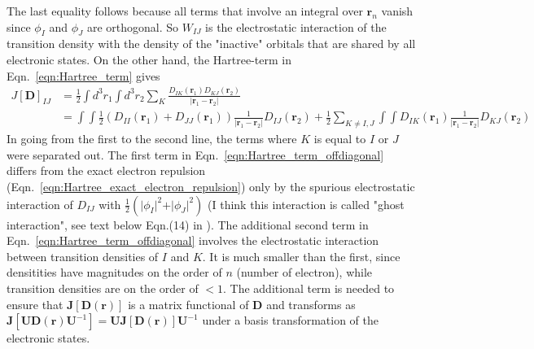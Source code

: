 \documentclass[journal=jpclcd,manuscript=letter]{achemso}
\newcommand\m[1]{\mathbf{#1}}
\renewcommand\vec[1]{\mathbf{#1}}
\begin{document}
The last equality follows because all terms that involve an integral over $\vec{r}_n$ vanish since $\phi_I$ and $\phi_J$ are orthogonal.
So $W_{IJ}$ is the electrostatic interaction of the transition density with the density of the "inactive" orbitals
that are shared by all electronic states. On the other hand, the Hartree-term in Eqn.~\ref{eqn:Hartree_term} gives
\begin{align}
 J[\m{D}]_{IJ} &= \frac{1}{2} \int d^3r_1 \int d^3r_2 \sum_K \frac{D_{IK}(\vec{r}_1) D_{KJ}(\vec{r}_2)}{\vert \vec{r}_1 - \vec{r}_2 \vert} \nonumber \\
 &= \int \int \frac{1}{2} 
  \left( D_{II}(\vec{r}_1) + D_{JJ}(\vec{r}_1) \right)
  \frac{1}{\vert \vec{r}_1 - \vec{r}_2 \vert}
  D_{IJ}(\vec{r}_2) +
  \frac{1}{2} \sum_{K \neq I,J} \int \int D_{IK}(\vec{r}_1) \frac{1}{\vert \vec{r}_1 - \vec{r}_2 \vert} D_{KJ}(\vec{r}_2)
  \label{eqn:Hartree_term_offdiagonal}
\end{align}
In going from the first to the second line, the terms where $K$ is equal to $I$ or $J$ were separated out.
The first term in Eqn.~\ref{eqn:Hartree_term_offdiagonal} differs from the exact electron repulsion (Eqn.~\ref{eqn:Hartree_exact_electron_repulsion})
only by the spurious electrostatic interaction of $D_{IJ}$ with $\frac{1}{2} (\vert \phi_I \vert^2 + \vert \phi_J \vert^2)$
(I think this interaction is called "ghost interaction", see text below Eqn.(14) in \cite{Pastorczak2014}).
The additional second term in Eqn.~\ref{eqn:Hartree_term_offdiagonal} involves the electrostatic interaction
between transition densities of $I$ and $K$. It is much smaller than the first, since densitities have magnitudes
on the order of $n$ (number of electron), while transition densities are on the order of $<1$.
The additional term is needed to ensure that $\m{J}[\m{D}(\vec{r})]$ is a matrix functional of $\m{D}$ and transforms as
$\m{J}[\m{U} \m{D}(\vec{r}) \m{U}^{-1}] = \m{U} \m{J}[\m{D}(\vec{r})] \m{U}^{-1}$ under a basis transformation of the electronic states.
\end{document}
